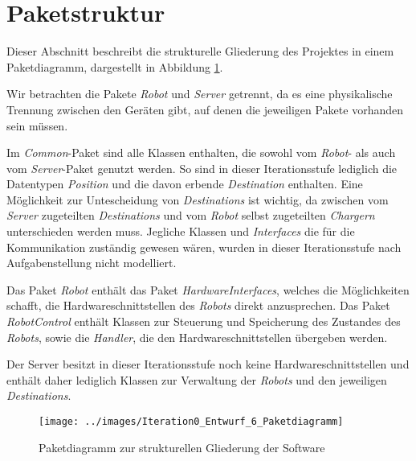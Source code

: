\section{Paketstruktur}
Dieser Abschnitt beschreibt die strukturelle Gliederung des Projektes in einem Paketdiagramm, dargestellt in Abbildung \ref{Paketstruktur}.

Wir betrachten die Pakete \textit{Robot} und \textit{Server} getrennt, da es eine physikalische Trennung zwischen den Geräten gibt, auf denen die jeweiligen Pakete vorhanden sein müssen.

Im \textit{Common}-Paket sind alle Klassen enthalten, die sowohl vom \textit{Robot}- als auch vom \textit{Server}-Paket genutzt werden. So sind in dieser Iterationsstufe lediglich die Datentypen \textit{Position} und die davon erbende \textit{Destination} enthalten. Eine Möglichkeit zur Untescheidung von \textit{Destinations} ist wichtig, da zwischen vom \textit{Server} zugeteilten \textit{Destinations} und vom \textit{Robot} selbst zugeteilten \textit{Chargern} unterschieden werden muss. Jegliche Klassen und \emph{Interfaces} die für die Kommunikation zuständig gewesen wären, wurden in dieser Iterationsstufe nach Aufgabenstellung nicht modelliert.

Das Paket \textit{Robot} enthält das Paket \textit{HardwareInterfaces}, welches die Möglichkeiten schafft, die Hardwareschnittstellen des \textit{Robots} direkt anzusprechen. Das Paket \textit{RobotControl} enthält Klassen zur Steuerung und Speicherung des Zustandes des \textit{Robots}, sowie die \emph{Handler}, die den Hardwareschnittstellen übergeben werden.

Der Server besitzt in dieser Iterationsstufe noch keine Hardwareschnittstellen und enthält daher lediglich Klassen zur Verwaltung der \textit{Robots} und den jeweiligen \textit{Destinations}.

\begin{figure}[H]
\centering
\texttt{[image: ../images/Iteration0\_Entwurf\_6\_Paketdiagramm]}
\caption{Paketdiagramm zur strukturellen Gliederung der Software}
\label{Paketstruktur}
\end{figure}